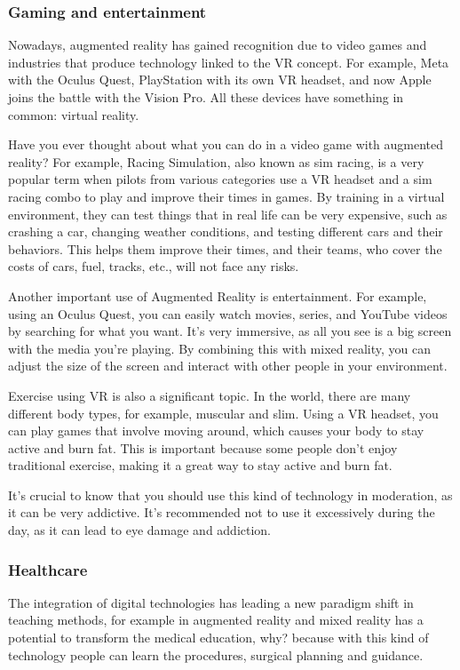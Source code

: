 \documentclass[twoside]{article}
\begin{document}
\subsubsection{Gaming and entertainment}
Nowadays, augmented reality has gained recognition due to video games and industries that produce technology linked to the VR concept. For example, Meta with the Oculus Quest, PlayStation with its own VR headset, and now Apple joins the battle with the Vision Pro. All these devices have something in common: virtual reality.

Have you ever thought about what you can do in a video game with augmented reality? For example, Racing Simulation, also known as sim racing, is a very popular term when pilots from various categories use a VR headset and a sim racing combo to play and improve their times in games. By training in a virtual environment, they can test things that in real life can be very expensive, such as crashing a car, changing weather conditions, and testing different cars and their behaviors. This helps them improve their times, and their teams, who cover the costs of cars, fuel, tracks, etc., will not face any risks.

Another important use of Augmented Reality is entertainment. For example, using an Oculus Quest, you can easily watch movies, series, and YouTube videos by searching for what you want. It’s very immersive, as all you see is a big screen with the media you’re playing. By combining this with mixed reality, you can adjust the size of the screen and interact with other people in your environment.

Exercise using VR is also a significant topic. In the world, there are many different body types, for example, muscular and slim. Using a VR headset, you can play games that involve moving around, which causes your body to stay active and burn fat. This is important because some people don’t enjoy traditional exercise, making it a great way to stay active and burn fat.

It’s crucial to know that you should use this kind of technology in moderation, as it can be very addictive. It’s recommended not to use it excessively during the day, as it can lead to eye damage and addiction.

\subsubsection{Healthcare}
The integration of digital technologies has leading a new paradigm shift in teaching methods, for example in augmented reality and mixed reality has a potential to transform the medical education, why? because with this kind of technology people can learn the procedures, surgical planning and guidance.
\end{document}
